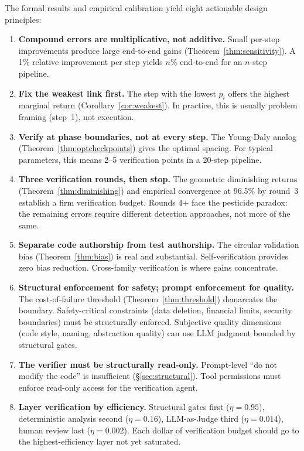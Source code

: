 \documentclass[11pt, a4paper, copyright]{googledeepmind}
\begin{document}
The formal results and empirical calibration yield eight actionable design principles:

\begin{enumerate}

\item \textbf{Compound errors are multiplicative, not additive.}
Small per-step improvements produce large end-to-end gains (Theorem~\ref{thm:sensitivity}).
A 1\% relative improvement per step yields $n$\% end-to-end for an $n$-step pipeline.

\item \textbf{Fix the weakest link first.}
The step with the lowest $p_i$ offers the highest marginal return (Corollary~\ref{cor:weakest}).
In practice, this is usually problem framing (step~1), not execution.

\item \textbf{Verify at phase boundaries, not at every step.}
The Young-Daly analog (Theorem~\ref{thm:optcheckpoints}) gives the optimal spacing.
For typical parameters, this means 2--5 verification points in a 20-step pipeline.

\item \textbf{Three verification rounds, then stop.}
The geometric diminishing returns (Theorem~\ref{thm:diminishing}) and empirical convergence at 96.5\% by round~3 establish a firm verification budget.
Rounds 4+ face the pesticide paradox: the remaining errors require different detection approaches, not more of the same.

\item \textbf{Separate code authorship from test authorship.}
The circular validation bias (Theorem~\ref{thm:bias}) is real and substantial.
Self-verification provides zero bias reduction.
Cross-family verification is where gains concentrate.

\item \textbf{Structural enforcement for safety; prompt enforcement for quality.}
The cost-of-failure threshold (Theorem~\ref{thm:threshold}) demarcates the boundary.
Safety-critical constraints (data deletion, financial limits, security boundaries) must be structurally enforced.
Subjective quality dimensions (code style, naming, abstraction quality) can use LLM judgment bounded by structural gates.

\item \textbf{The verifier must be structurally read-only.}
Prompt-level ``do not modify the code'' is insufficient (\S\ref{sec:structural}).
Tool permissions must enforce read-only access for the verification agent.

\item \textbf{Layer verification by efficiency.}
Structural gates first ($\eta = 0.95$), deterministic analysis second ($\eta = 0.16$), LLM-as-Judge third ($\eta = 0.014$), human review last ($\eta = 0.002$).
Each dollar of verification budget should go to the highest-efficiency layer not yet saturated.

\end{enumerate}
\end{document}
